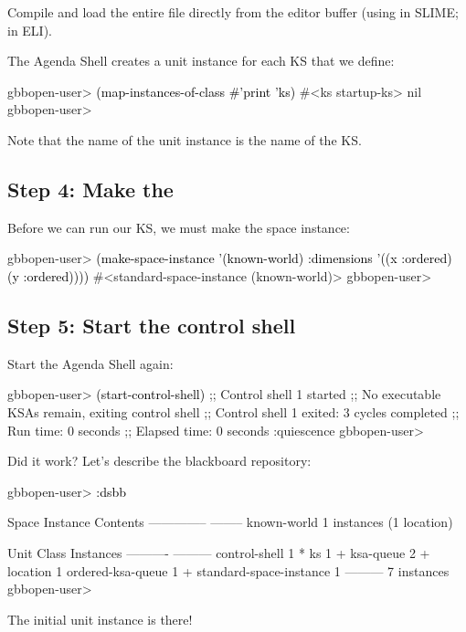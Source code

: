 \documentclass[10pt,twoside,english,pdftex]{article}
\begin{document}
Compile and load the entire  file directly from
the editor buffer (using  in SLIME;  in ELI).

The Agenda Shell creates a  unit instance for each KS that we
define:
%
\W\supp
\begin{example}
\textcolor{darkergray}{%
  gbbopen-user> \textcolor{black}{(map-instances-of-class #'print 'ks)}
  #<ks startup-ks> 
  nil
  gbbopen-user>}
\end{example}
%
Note that the name of the  unit instance is the name of the KS.

\subsection*{Step 4: Make the }

Before we can run our KS, we must make the  space
instance:
%
\W\supp
\begin{example}
\textcolor{darkergray}{%
  gbbopen-user> \textcolor{black}{(make-space-instance '(known-world)
                          :dimensions '((x :ordered) (y :ordered))))}
  #<standard-space-instance (known-world)>
  gbbopen-user>}
\end{example}

\subsection*{Step 5: Start the control shell}

%
%
Start the Agenda Shell again:
%
\W\supp
\begin{example}
\textcolor{darkergray}{%
  gbbopen-user> \textcolor{black}{(start-control-shell)}
  ;; Control shell 1 started
  ;; No executable KSAs remain, exiting control shell
  ;; Control shell 1 exited: 3 cycles completed
  ;; Run time: 0 seconds
  ;; Elapsed time: 0 seconds
  :quiescence
  gbbopen-user>}
\end{example}

%
%
Did it work?  Let's describe the blackboard repository:
%
\W\supp
\begin{example}
\textcolor{darkergray}{%
  gbbopen-user> \textcolor{black}{:dsbb}
  
  Space Instance                Contents
  --------------                --------
  known-world                   1 instances (1 location)

  Unit Class                    Instances
  ----------                    ---------
  control-shell                         1 *
  ks                                    1 +
  ksa-queue                             2 +
  location                              1
  ordered-ksa-queue                     1 +
  standard-space-instance               1
                                ---------
                                        7 instances
  gbbopen-user>}
\end{example}
%
The initial  unit instance is there!
\end{document}
